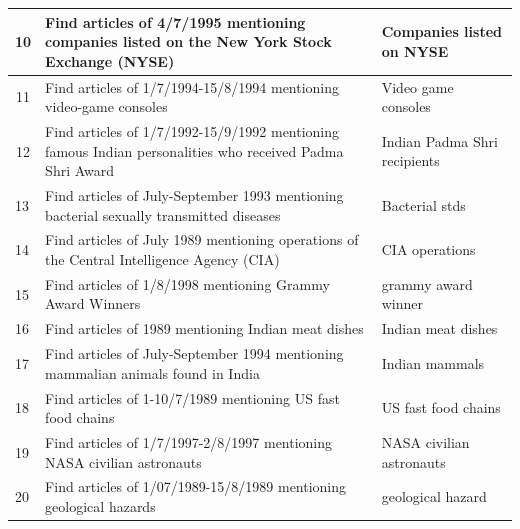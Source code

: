 \documentclass[twocolumn]{svjour3}
\begin{document}
\begin{table}[]
\begin{tabular}{|c|p{120mm}|p{44mm}|}
10                       & Find articles of 4/7/1995 mentioning companies listed on the New York Stock Exchange (NYSE)              & Companies listed on NYSE                     \\ \hline
11                       & Find articles of 1/7/1994-15/8/1994 mentioning video-game consoles                                       & Video game consoles                          \\ \hline
12                       & Find articles of 1/7/1992-15/9/1992 mentioning famous Indian personalities who received Padma Shri Award & Indian Padma Shri recipients                 \\ \hline
\multicolumn{1}{|l|}{13} & Find articles of July-September 1993 mentioning bacterial sexually transmitted diseases                  & Bacterial stds                               \\ \hline
\multicolumn{1}{|l|}{14} & Find articles of July 1989 mentioning operations of the Central Intelligence Agency (CIA)                & CIA operations                               \\ \hline
\multicolumn{1}{|l|}{15} & Find articles of 1/8/1998 mentioning Grammy Award Winners                                               & grammy award winner                          \\ \hline
\multicolumn{1}{|l|}{16} & Find articles of 1989 mentioning Indian meat dishes                                                      & Indian meat dishes                           \\ \hline
\multicolumn{1}{|l|}{17} & Find articles of July-September 1994 mentioning mammalian animals found in India                         & Indian mammals                               \\ \hline
\multicolumn{1}{|l|}{18} & Find articles of 1-10/7/1989 mentioning US fast food chains                                              & US fast food chains                          \\ \hline
\multicolumn{1}{|l|}{19} & Find articles of 1/7/1997-2/8/1997 mentioning NASA civilian astronauts                                   & NASA civilian astronauts                     \\ \hline
\multicolumn{1}{|l|}{20} & Find articles of 1/07/1989-15/8/1989 mentioning geological hazards                                       & geological hazard                            \\ \hline
\end{tabular}
\end{table}
\end{document}
